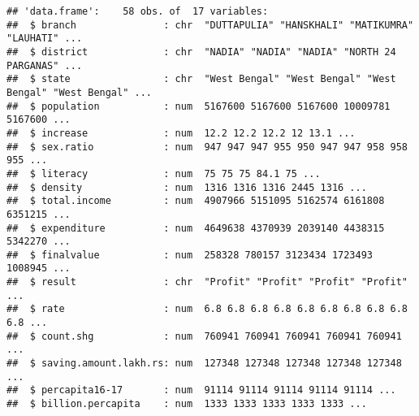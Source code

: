 \documentclass[]{article}
\begin{document}
\begin{verbatim}
## 'data.frame':    58 obs. of  17 variables:
##  $ branch               : chr  "DUTTAPULIA" "HANSKHALI" "MATIKUMRA" "LAUHATI" ...
##  $ district             : chr  "NADIA" "NADIA" "NADIA" "NORTH 24 PARGANAS" ...
##  $ state                : chr  "West Bengal" "West Bengal" "West Bengal" "West Bengal" ...
##  $ population           : num  5167600 5167600 5167600 10009781 5167600 ...
##  $ increase             : num  12.2 12.2 12.2 12 13.1 ...
##  $ sex.ratio            : num  947 947 947 955 950 947 947 958 958 955 ...
##  $ literacy             : num  75 75 75 84.1 75 ...
##  $ density              : num  1316 1316 1316 2445 1316 ...
##  $ total.income         : num  4907966 5151095 5162574 6161808 6351215 ...
##  $ expenditure          : num  4649638 4370939 2039140 4438315 5342270 ...
##  $ finalvalue           : num  258328 780157 3123434 1723493 1008945 ...
##  $ result               : chr  "Profit" "Profit" "Profit" "Profit" ...
##  $ rate                 : num  6.8 6.8 6.8 6.8 6.8 6.8 6.8 6.8 6.8 6.8 ...
##  $ count.shg            : num  760941 760941 760941 760941 760941 ...
##  $ saving.amount.lakh.rs: num  127348 127348 127348 127348 127348 ...
##  $ percapita16-17       : num  91114 91114 91114 91114 91114 ...
##  $ billion.percapita    : num  1333 1333 1333 1333 1333 ...
\end{verbatim}
\end{document}
